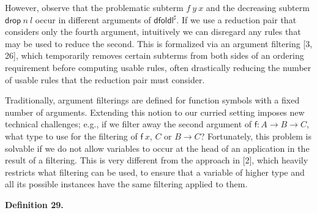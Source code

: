  
 
However, observe that the problematic subterm ${{f}\ {y}}\ {x}$ and the decreasing subterm ${{\mathsf{drop}}\ {n}}\ {l}$ occur in different arguments of $\mathsf{dfoldl}^{\sharp}$. If we use a reduction pair that considers only the fourth argument, intuitively we can disregard any rules that may be used to reduce the second. This is formalized via an argument filtering [3, 26], which temporarily removes certain subterms from both sides of an ordering requirement before computing usable rules, often drastically reducing the number of usable rules that the reduction pair must consider.\par
 
 
 
Traditionally, argument filterings are defined for function symbols with a fixed number of arguments. Extending this notion to our curried setting imposes new technical challenges; e.g., if we filter away the second argument of $\mathsf{f}:A\rightarrow B\rightarrow C$, what type to use for the filtering of ${\mathsf{f}}\ {x}$, $C$ or $B\rightarrow C$? Fortunately, this problem is solvable if we do not allow variables to occur at the head of an application in the result of a filtering. This is very different from the approach in [2], which heavily restricts what filtering can be used, to ensure that a variable of higher type and all its possible instances have the same filtering applied to them.\par
 
 
 
\par\medskip\noindent\textbf{Definition 29.}\par
 
 
